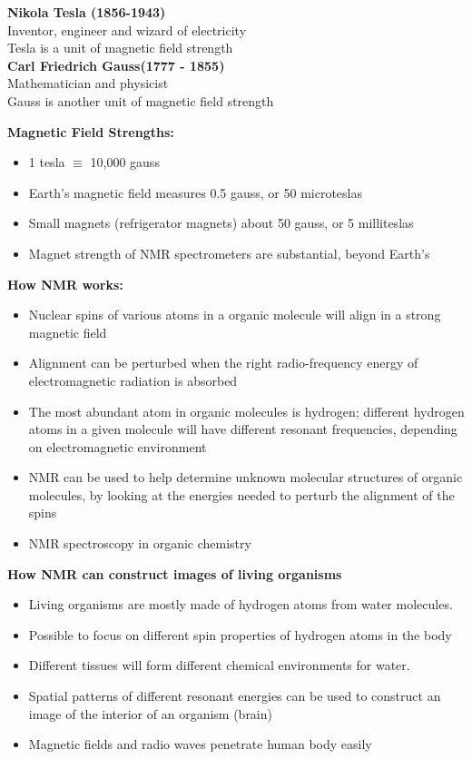 \documentclass{article}
\begin{document}
\textbf{Nikola Tesla (1856-1943)}\\
Inventor, engineer and wizard of electricity \\ 
Tesla is a unit of magnetic field strength \\

\textbf{Carl Friedrich Gauss(1777 - 1855)} \\
Mathematician and physicist \\ 
Gauss is another unit of magnetic field strength \\

\newpage

\noindent \textbf{Magnetic Field Strengths:} 
\begin{itemize}
    \item 1 tesla $\equiv$ 10,000 gauss
    \item Earth's magnetic field measures 0.5 gauss, or 50 microteslas
    \item Small magnets (refrigerator magnets) about 50 gauss, or 5 milliteslas 
    \item Magnet strength of NMR spectrometers are substantial, beyond Earth's 
\end{itemize}
\bigskip
\nodindent \textbf{How NMR works:}
\begin{itemize}
    \item Nuclear spins of various atoms in a organic molecule will align in a strong magnetic field
    \item Alignment can be perturbed when the right radio-frequency energy of electromagnetic radiation is absorbed
    \item The most abundant atom in organic molecules is hydrogen; different hydrogen atoms in a given molecule will have different resonant frequencies, depending on electromagnetic environment
    \item NMR can be used to help determine unknown molecular structures of organic molecules, by looking at the energies needed to perturb the alignment of the spins 
    \item NMR spectroscopy in organic chemistry
\end{itemize}
\bigskip
\noindent \textbf{How NMR can construct images of living organisms}
\begin{itemize}
    \item Living organisms are mostly made of hydrogen atoms from water molecules. 
    \item Possible to focus on different spin properties of hydrogen atoms in the body
    \item Different tissues will form different chemical environments for water. 
    \item Spatial patterns of different resonant energies can be used to construct an image of the interior of an organism (brain) 
    \item Magnetic fields and radio waves penetrate human body easily
\end{itemize}
\end{document}
